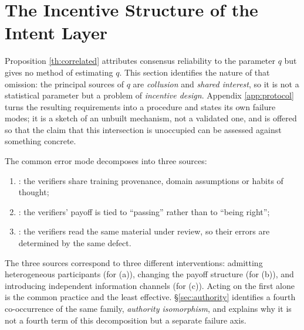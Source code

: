 \section{The Incentive Structure of the Intent Layer}\label{sec:mechanism}

Proposition \ref{th:correlated} attributes consensus reliability to the parameter $q$ but
gives no method of estimating $q$. This section identifies the nature of that omission: the
principal sources of $q$ are \emph{collusion} and \emph{shared interest}, so it is not a
statistical parameter but a problem of \emph{incentive design}. Appendix \ref{app:protocol} turns
the resulting requirements into a procedure and states its own failure modes; it is a sketch of an
unbuilt mechanism, not a validated one, and is offered so that the claim that this intersection is
unoccupied can be assessed against something concrete.

\begin{principle}\label{pr:q-decomposition}
The common error mode decomposes into three sources:
\begin{enumerate}[label=(\alph*)]
\item {}: the verifiers share training provenance, domain
      assumptions or habits of thought;
\item {}: the verifiers' payoff is tied to ``passing'' rather than
      to ``being right'';
\item {}: the verifiers read the same material under review, so
      their errors are determined by the same defect.
\end{enumerate}
The three sources correspond to three different interventions: admitting heterogeneous
participants (for (a)), changing the payoff structure (for (b)), and introducing independent
information channels (for (c)). Acting on the first alone is the common practice and the
least effective. \S\ref{sec:authority} identifies a fourth co-occurrence of the same family,
\emph{authority isomorphism}, and explains why it is not a fourth term of this decomposition but a
separate failure axis.
\end{principle}

